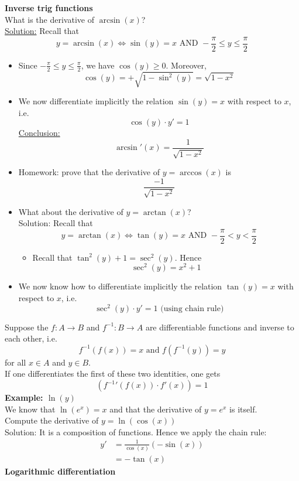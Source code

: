 \documentclass[]{article}
\begin{document}
	\large{\bf Inverse trig functions}\\
	\normalsize
	What is the derivative of $\arcsin(x)$?\\
	\underline{Solution:} Recall that
	$$
		y=\arcsin(x)\iff\sin(y)=x\text{ AND }-\frac{\pi}{2}\le y\le\frac{\pi}{2}
	$$
	\begin{itemize}
		\item Since $-\frac{\pi}{2}\le y\le\frac{\pi}{2}$, we have $\cos(y)\ge 0$. Moreover,
		$$
			\cos(y)=+\sqrt{1-\sin^2(y)}=\sqrt{1-x^2}
		$$
		\item We now differentiate implicitly the relation $\sin(y)=x$ with respect to  $x$, i.e.
		$$
			\cos(y)\cdot y'=1
		$$
		\underline{Conclusion:}
		$$
			\arcsin'(x)=\frac{1}{\sqrt{1-x^2}}
		$$
		\item Homework: prove that the derivative of $y=\arccos(x)$ is
		$$
			\frac{-1}{\sqrt{1-x^2}}
		$$
		\item What about the derivative of $y=\arctan(x)$?\\
		Solution: Recall that
		$$
			y=\arctan(x)\iff\tan(y)=x\text{ AND }-\frac{\pi}{2}<y<\frac{\pi}{2}
		$$
		\begin{itemize}
			\item Recall that $\tan^2(y)+1=\sec^2(y)$. Hence
			$$
				\sec^2(y)=x^2+1
			$$
		\end{itemize}
		\item We now know how  to differentiate implicitly the relation $\tan(y)=x$ with respect to $x$, i.e.
		$$
			\sec^2(y)\cdot y'=1\text{ (using chain rule)}
		$$
	\end{itemize}
	Suppose the $f:A\rightarrow B$ and $f^{-1}:B\rightarrow A$ are differentiable functions and inverse to each other, i.e.
	$$
		f^{-1}(f(x))=x\text{ and }f(f^{-1}(y))=y
	$$
	for all $x\in A$ and $y\in B$.\\
	If one differentiates the first of these two identities, one gets
	$$
		(f^{-1}'(f(x))\cdot f'(x))=1
	$$
	{\bf Example: $\ln(y)$}\\
	We know that $\ln(e^x)=x$ and that the derivative of $y=e^x$ is itself.\\
	Compute the derivative of $y=\ln(\cos(x))$\\
	Solution: It is a composition of functions. Hence we apply the chain rule:
	\begin{align*}
		y'&=\frac{1}{\cos(x)}(-\sin(x))\\
		&=-\tan(x)
	\end{align*}
	\pagebreak
	\large{\bf Logarithmic differentiation}\\
\end{document}
